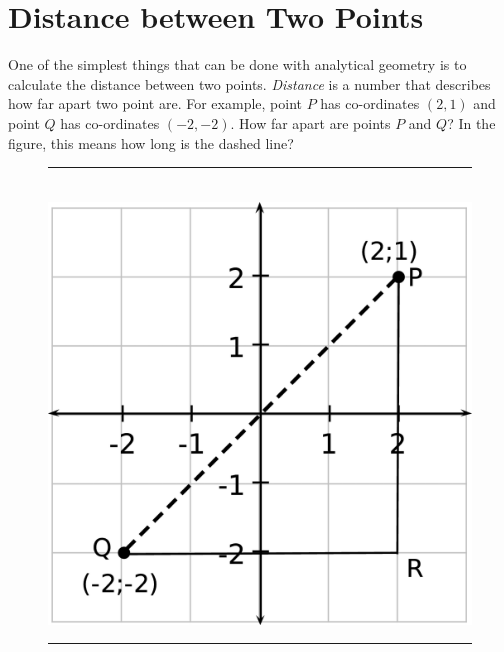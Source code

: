            \section{ Distance between Two Points}
            \nopagebreak
            \label{m39107*id66786}One of the simplest things that can be done with analytical geometry is to calculate the distance between two points. \textsl{Distance} is a number that describes how far apart two point are. For example, point \begin{math}P\end{math} has co-ordinates \begin{math}\left(2,1\right)\end{math} and point \begin{math}Q\end{math} has co-ordinates \begin{math}\left(-2,-2\right)\end{math}. How far apart are points \begin{math}P\end{math} and \begin{math}Q\end{math}? In the figure, this means how long is the dashed line?\par 
    \setcounter{subfigure}{0}
	\begin{figure}[H] %
    \begin{center}
    \rule[.1in]{\figurerulewidth}{.005in} \\
        \label{m39107*uid38!!!underscore!!!media}\label{m39107*uid38!!!underscore!!!printimage}\includegraphics[width=0.5\columnwidth]{col11306.imgs/m39107_MG10C14_015.png} %
      \vspace{2pt}
    \vspace{.1in}
    \rule[.1in]{\figurerulewidth}{.005in} \\
    \end{center}
 \end{figure}       
